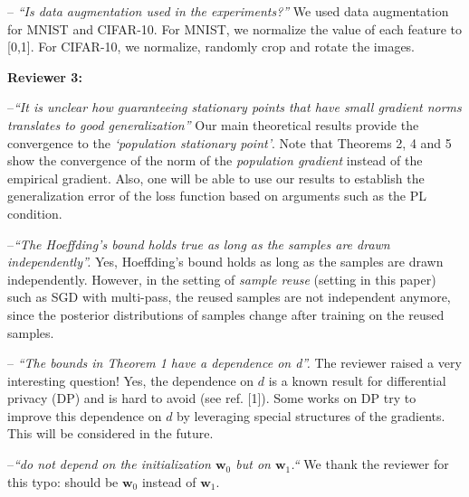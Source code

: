 \documentclass{article}
\begin{document}
-- \textit{``Is data augmentation used in the experiments?''}
We used data augmentation for MNIST and CIFAR-10. 
For MNIST, we normalize the value of each feature to [0,1]. 
For CIFAR-10, we normalize, randomly crop and rotate the images.


    


\textbf{Reviewer 3:}
\vspace{-4pt}

--\textit{``It is unclear how guaranteeing stationary points that have small gradient norms translates to good generalization''}
Our main theoretical results provide the convergence to the \emph{`population stationary point'}. 
Note that Theorems 2, 4 and 5 show the convergence of the norm of the \emph{population gradient} instead of the empirical gradient. 
Also, one will be able to use our results to establish the generalization error of the loss function based on arguments such as the PL condition. \vspace{-4pt}
    
--\textit{``The Hoeffding's bound holds true as long as the samples are drawn independently''.}
 Yes, Hoeffding's bound holds as long as the samples are drawn independently. 
However, in the setting of
\emph{sample reuse} (setting in this paper) such as SGD with multi-pass, the reused samples are not independent anymore,
since the posterior distributions of samples change after training on the reused samples.
\vspace{-4pt}
 

 -- \textit{``The bounds in Theorem 1 have a dependence on d''.}
The reviewer raised a very interesting question!
Yes, the dependence on $d$ is a known result for differential privacy (DP) and is hard to avoid (see ref. [1]). 
Some works on DP try to improve this dependence on $d$ by leveraging special structures of the gradients. 
This will be considered in the future. \vspace{-4pt}
    

--\textit{``do not depend on the initialization $\mathbf{w}_0$ but on $\mathbf{w}_1$.``}
We thank the reviewer for this typo: should be $\mathbf{w}_0$ instead of $\mathbf{w}_1$.\vspace{-4pt}
    
\end{document}
